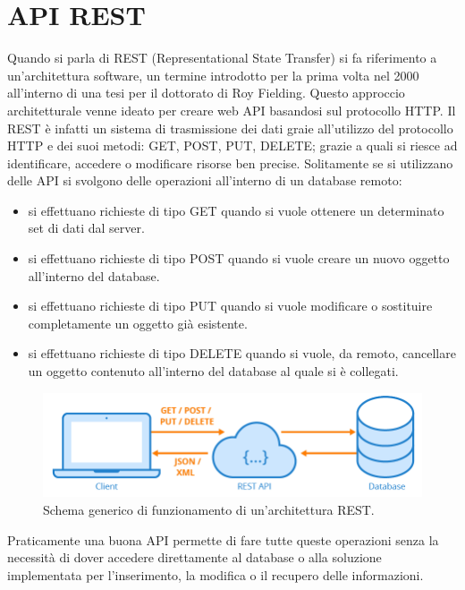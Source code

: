\section{API REST}
Quando si parla di REST (Representational State Transfer) si fa riferimento a un'architettura software, un termine introdotto per la prima volta 
nel 2000 all'interno di una tesi per il dottorato di Roy Fielding. Questo approccio architetturale venne ideato per creare web API basandosi 
sul protocollo HTTP. Il REST è infatti un sistema di trasmissione dei dati graie all'utilizzo del protocollo HTTP e dei suoi metodi: 
GET, POST, PUT, DELETE; grazie a quali si riesce ad identificare, accedere o modificare risorse ben precise.\hfill\break
Solitamente se si utilizzano delle API si svolgono delle operazioni all’interno di un database remoto:
\begin{itemize}
    \item si effettuano richieste di tipo GET quando si vuole ottenere un determinato set di dati dal server.
    \item si effettuano richieste di tipo POST quando si vuole creare un nuovo oggetto all’interno del database.
    \item si effettuano richieste di tipo PUT quando si vuole modificare o sostituire completamente un oggetto già esistente.
    \item si effettuano richieste di tipo DELETE quando si vuole, da remoto, cancellare un oggetto contenuto all’interno del 
    database al quale si è collegati.
\end{itemize}
%
\begin{figure}[ht!]
    \centering
    \includegraphics[scale=0.6]{images/api_rest.png}
    \caption{Schema generico di funzionamento di un'architettura REST.}
    \label{fig:rest_api}
\end{figure}
Praticamente una buona API permette di fare tutte queste operazioni senza la necessità di dover accedere direttamente al database o alla 
soluzione implementata per l'inserimento, la modifica o il recupero delle informazioni.
%
